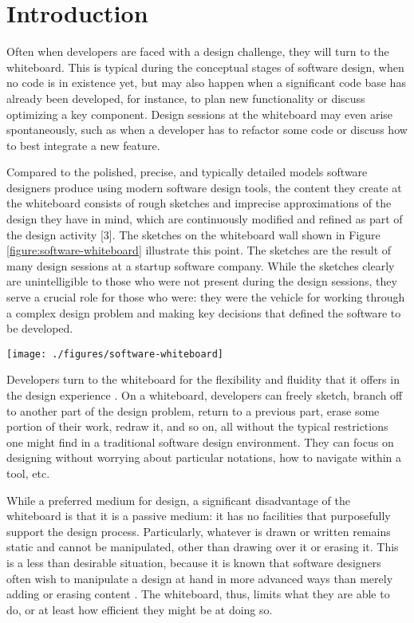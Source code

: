 \chapter{Introduction}
\label{chapter:introduction}

Often when developers are faced with a design challenge, they will turn to the whiteboard.  This is typical during the conceptual stages of software design, when no code is in existence yet, but may also happen when a significant code base has already been developed, for instance, to plan new functionality or discuss optimizing a key component. Design sessions at the whiteboard may even arise spontaneously, such as when a developer has to refactor some code or discuss how to best integrate a new feature.

Compared to the polished, precise, and typically detailed models software designers produce using modern software design tools, the content they create at the whiteboard consists of rough sketches and imprecise approximations of the design they have in mind, which are continuously modified and refined as part of the design activity [3]. The sketches on the whiteboard wall shown in Figure \ref{figure:software-whiteboard} illustrate this point. The sketches are the result of many design sessions at a startup software company. While the sketches clearly are unintelligible to those who were not present during the design sessions, they serve a crucial role for those who were: they were the vehicle for working through a complex design problem and making key decisions that defined the software to be developed.

\begin{figure*}[tbh]
  \centering
  \texttt{[image: ./figures/software-whiteboard]}
  \caption{Whiteboard wall at a startup company.}
  \label{figure:software-whiteboard}
\end{figure*}

Developers turn to the whiteboard for the flexibility and fluidity that it offers in the design experience \cite{cherubini2007let}. On a whiteboard, developers can freely sketch, branch off to another part of the design problem, return to a previous part, erase some portion of their work, redraw it, and so on, all without the typical restrictions one might find in a traditional software design environment. They can focus on designing without worrying about particular notations, how to navigate within a tool, etc.

While a preferred medium for design, a significant disadvantage of the whiteboard is that it is a passive medium: it has no facilities that purposefully support the design process. Particularly, whatever is drawn or written remains static and cannot be manipulated, other than drawing over it or erasing it. This is a less than desirable situation, because it is known that software designers often wish to manipulate a design at hand in more advanced ways than merely adding or erasing content \cite{dekel2007notation}. The whiteboard, thus, limits what they are able to do, or at least how efficient they might be at doing so.

